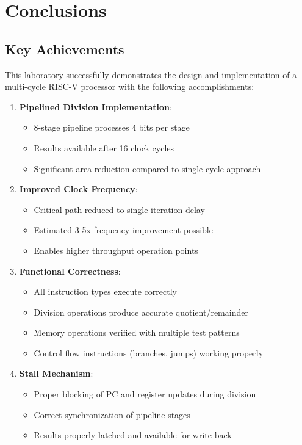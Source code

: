 \documentclass[a4paper, 11pt]{article}
\begin{document}
\newpage

\section{Conclusions}

\subsection{Key Achievements}

This laboratory successfully demonstrates the design and implementation of a multi-cycle RISC-V processor with the following accomplishments:

\begin{enumerate}
    \item \textbf{Pipelined Division Implementation}:
    \begin{itemize}
        \item 8-stage pipeline processes 4 bits per stage
        \item Results available after 16 clock cycles
        \item Significant area reduction compared to single-cycle approach
    \end{itemize}
    
    \item \textbf{Improved Clock Frequency}:
    \begin{itemize}
        \item Critical path reduced to single iteration delay
        \item Estimated 3-5x frequency improvement possible
        \item Enables higher throughput operation points
    \end{itemize}
    
    \item \textbf{Functional Correctness}:
    \begin{itemize}
        \item All instruction types execute correctly
        \item Division operations produce accurate quotient/remainder
        \item Memory operations verified with multiple test patterns
        \item Control flow instructions (branches, jumps) working properly
    \end{itemize}
    
    \item \textbf{Stall Mechanism}:
    \begin{itemize}
        \item Proper blocking of PC and register updates during division
        \item Correct synchronization of pipeline stages
        \item Results properly latched and available for write-back
    \end{itemize}
\end{enumerate}
\end{document}
